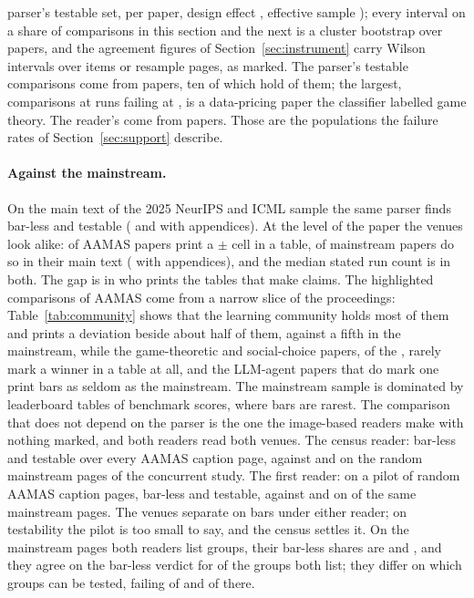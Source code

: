 \documentclass[sigconf,anonymous]{aamas}
\begin{document}
parser's testable set, \nAMeanCluster{} per paper, design effect
\nADesignEffect{}, effective sample \nANEff{}); every interval on a share
of comparisons in this section and the next is a cluster bootstrap over
papers, and the agreement figures of Section~\ref{sec:instrument} carry
Wilson intervals over items or resample pages, as marked. The parser's \nANTestable{}
testable comparisons come from \nAPapersTestable{} papers, ten of which
hold \nTopTenPapersShare{} of them; the largest, \nLargestN{} comparisons
at \nLargestRuns{} runs failing at \nLargestFail{}, is a data-pricing
paper the classifier labelled game theory. The reader's \nCzReaderFailN{}
come from \nCzReaderFailPapers{} papers. Those are the populations the
failure rates of Section~\ref{sec:support} describe.

\paragraph{Against the mainstream.} On the main text of the 2025 NeurIPS and
ICML sample the same parser finds \nMlMainNeither{} bar-less and
\nMlMainTestable{} testable (\nMlPctNeither{} and \nMlPctTestable{} with
appendices). At the level of the paper the venues look alike:
\nAPctPapersErr{} of AAMAS papers print a $\pm$ cell in a table,
\nMlMainPapersErr{} of mainstream papers do so in their main text
(\nMlPctPapersErr{} with appendices), and the median stated run count is
\nAMedianRuns{} in both. The gap is in who prints the tables that make
claims. The highlighted comparisons of AAMAS come from a narrow slice of
the proceedings:
Table~\ref{tab:community} shows that the learning community holds most of
them and prints a deviation beside about half of them, against a fifth in
the mainstream, while the
game-theoretic and social-choice papers, \nCGameTheorySocialChoicePapers{}
of the \nAPapers{}, rarely mark a winner in a table at all, and the
LLM-agent papers that do mark one print bars as seldom as the mainstream.
The mainstream sample is dominated by leaderboard tables of benchmark
scores, where bars are rarest. The comparison that does not depend on the
parser is the one the image-based readers make with nothing marked, and
both readers read both venues. The census reader: \nCzNeitherCi{}
bar-less and \nCzTestableCi{} testable over every AAMAS caption page,
against \nMsNeitherCi{} and \nMsTestableCi{} on the \nMsPages{} random
mainstream pages of the concurrent study. The first reader: on a pilot of
\nPagesRead{} random AAMAS caption pages, \nPagesReaderNeither{} bar-less
and \nPagesReaderTestable{} testable, against \nScReaderNeither{} and
\nScReaderTestable{} on \nScPages{} of the same mainstream pages. The
venues separate on bars under either reader; on testability the pilot is
too small to say, and the census settles it.
On the \nMsCrossSharedPages{} mainstream pages both readers list groups,
their bar-less shares are \nMsCrossSharedFirstNeither{} and
\nMsCrossSharedSecondNeither{}, and they agree on the bar-less verdict for
\nMsCrossSharedNeitherAgreePct{} of the \nMsCrossSharedMatched{} groups
both list; they differ on which groups can be tested, failing
\nMsCrossSharedFailFirst{} of \nMsCrossSharedTestedFirst{} and
\nMsCrossSharedFailSecond{} of \nMsCrossSharedTestedSecond{} there.
\end{document}
